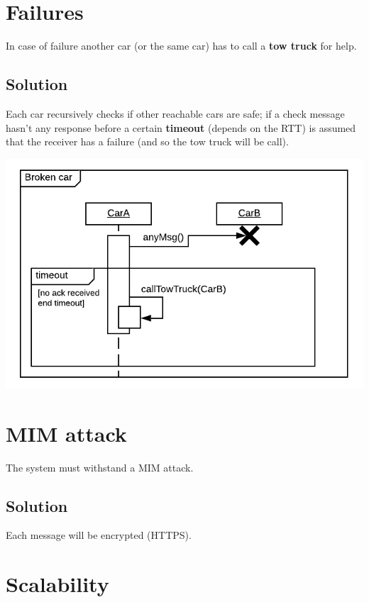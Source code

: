 \section{Failures}

In case of failure another car (or the same car) has to call a \textbf{tow truck} for help.


\subsection{Solution}

Each car recursively checks if other reachable cars are safe; if a check message
hasn't any response before a certain \textbf{timeout} (depends on the RTT) is assumed 
that the receiver has a failure (and so the tow truck will be call).

\begin{center}
    \includegraphics[scale=0.9]{assets/ds2019_4.png}
\end{center}


\section{MIM attack}

The system must withstand a MIM attack.


\subsection{Solution}

Each message will be encrypted (HTTPS).


\section{Scalability}

